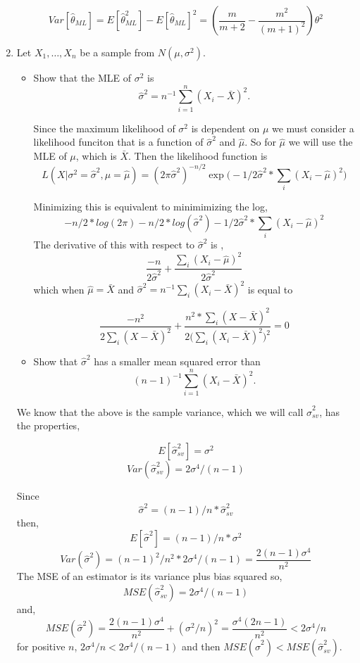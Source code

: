 \documentclass{article}
\begin{document}
\begin{enumerate}
\[
Var[\hat\theta_{ML}] = E[\hat{\theta}_{ML}^2] - E[\hat{\theta}_{ML}]^2 = (\frac{m}{m+2} - \frac{m^2}{(m+1)^2}) \theta^2
\]

\color{black}

\item
Let $X_1, \ldots, X_n$ be a sample from $N(\mu, \sigma^2)$.
\begin{itemize}
\item Show that the MLE of $\sigma^2$ is
$${\hat\sigma}^2 = n^{-1} \sum_{i=1}^n (X_i - \bar X)^2.$$

\color{blue}
Since the maximum likelihood of $\sigma^2$ is dependent on $\mu$ we must consider a likelihood funciton that is a function of $\hat{\sigma}^2$ and $\hat{\mu}$. So for $\hat{\mu}$ we will use the MLE of $\mu$, which is $\bar{X}$. 
Then the likelihood function is 
$$
L(X | \sigma^2 = \hat{\sigma}^2, \mu = \hat{\mu}) = (2\pi \hat \sigma^2)^{-n/2} \exp\big(-1/2\hat \sigma^2 * \sum_i (X_i - \hat{\mu})^2 \big)
$$ 

Minimizing this is equivalent to minimimizing the log,
$$
-n/2 * log(2\pi) -n/2 *log(\hat\sigma^2) - 1/2 \hat\sigma^2 * \sum_i (X_i - \hat\mu)^2
$$
The derivative of this with respect to $\hat\sigma^2$ is ,
$$\frac{-n}{2\hat\sigma^2} + \frac{\sum_i (X_i - \hat\mu)^2}{2 \hat\sigma^2}$$
which when $\hat\mu = \bar{X}$ and 
$\hat\sigma^2 = n^{-1} \sum_i (X_i - \bar{X})^2$ is equal to 


$$
\frac{-n^2}{2 \sum_i (X - \bar{X})^2} + \frac{n^2 * \sum_i (X- \bar{X})^2}{2 \big(\sum_i (X_i - \bar {X})^2 \big)^2} = 0
$$

\color{black}


\item Show that ${\hat\sigma}^2$ has a smaller mean squared error than 
$$(n-1)^{-1} \sum_{i=1}^n (X_i - \bar X)^2.$$
\end{itemize}
\color{blue}
We know that the above is the sample variance, which we will call $\hat\sigma_{sv}^2$,
has the properties,

$$E[\hat\sigma^2_{sv}] = \sigma^2$$
$$Var(\hat\sigma^2_{sv}) =  2\sigma^4/(n-1)$$

Since $$\hat\sigma ^2 = (n-1)/n * \hat\sigma^2_{sv}$$
then,
$$
E[\hat\sigma^2] = (n-1)/n * \sigma^2
$$
$$
Var(\hat\sigma^2) = (n-1)^2/n^2 * 2\sigma^4/(n-1) = \frac{2(n-1)\sigma^4}{n^2}
$$
The MSE of an estimator is its variance plus bias squared so,
$$
MSE(\hat\sigma^2_{sv}) = 2\sigma^4/(n-1)
$$
and,
$$
MSE(\hat\sigma^2) = \frac{2(n-1)\sigma^4}{n^2} + (\sigma^2/n)^2 = \frac{\sigma^4 (2n-1)}{n^2} < 2\sigma^4 / n
$$
for positive $n$, $2\sigma^4/n < 2\sigma^4 / (n-1)$
and then
$MSE(\hat\sigma^2) < MSE(\hat\sigma^2_{sv})$.  


\end{enumerate}
\end{document}
